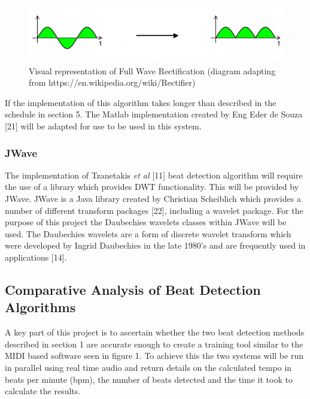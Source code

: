 \documentclass[a4paper, 11pt]{article}
\begin{document}
\begin{figure}[h]
	\centering
	\includegraphics[scale=0.25]{FWR2}
	\caption{Visual representation of Full Wave Rectification (diagram adapting from https://en.wikipedia.org/wiki/Rectifier)}
\end{figure}

If the implementation of this algorithm takes longer than described in the schedule in   section 5. The Matlab implementation created by Eng Eder de Souza [21] will be adapted for use to be used in this system. 

\subsubsection{JWave}
The implementation of Tzanetakis \textit{et al} [11] beat detection algorithm will require the use of a library which provides DWT functionality. This will be provided by JWave. JWave is a Java library created by Christian Scheiblich which provides a number of different transform packages [22], including a wavelet package. For the purpose of this project the Daubechies wavelets classes within JWave will be used. The Daubechies wavelets are a form of discrete wavelet transform which were developed by Ingrid Daubechies in the late 1980's and are frequently used in applications [14]. 

\subsection{Comparative Analysis of Beat Detection Algorithms}
A key part of this project is to ascertain whether the two beat detection methods described in section 1 are accurate enough to create a training tool similar to the MIDI based software seen in figure 1. To achieve this the two systems will be run in parallel using real time audio and return details on the calculated tempo in beats per minute (bpm), the number of beats detected and the time it took to calculate the results. 
\end{document}
